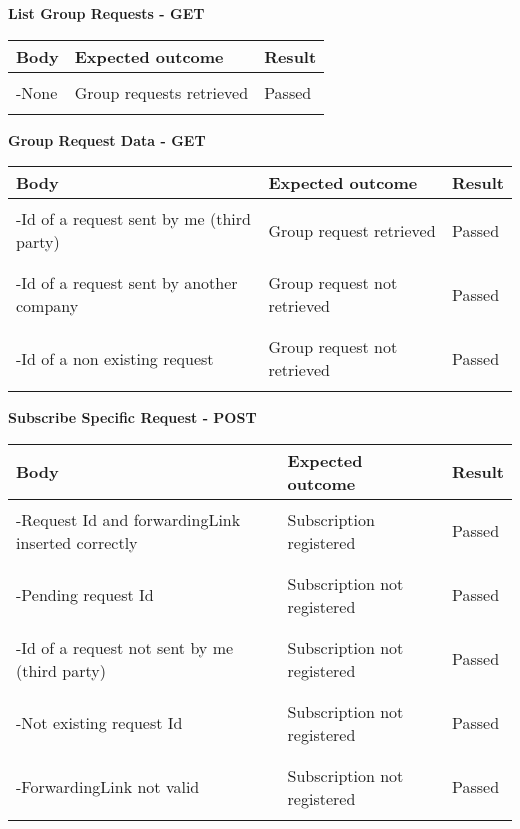 \textbf{List Group Requests - GET}
\begin{center}
	\begin{tabular}{|p{}|p{}|p{}|}
		\hline
		Body & Expected outcome & Result \\
		\hline
		&&\\
		-None  &Group requests retrieved&Passed\\
		&&\\
		\hline
	\end{tabular}
\end{center}
\textbf{Group Request Data - GET}
\begin{center}
	\begin{tabular}{|p{}|p{}|p{}|}
		\hline
		Body & Expected outcome & Result \\
		\hline
		&&\\
		-Id of a request sent by me (third party)  &Group request retrieved&Passed\\
		&&\\
		\hline
		&&\\
		-Id of a request sent by another company  &Group request not retrieved&Passed\\
		&&\\
		\hline
		&&\\
		-Id of a non existing request  &Group request not retrieved&Passed\\
		&&\\
		\hline
	\end{tabular}
\end{center}
\newpage
\textbf{Subscribe Specific Request - POST} 
\begin{center}
	\begin{tabular}{|p{}|p{}|p{}|}
		\hline
		Body & Expected outcome & Result \\
		\hline
		&&\\
		-Request Id and forwardingLink inserted correctly&Subscription registered&Passed\\
		&&\\
		\hline
		&&\\
		-Pending request Id & Subscription not registered & Passed\\
		&&\\
		\hline
		&&\\
		-Id of a request not sent by me (third party)&Subscription not registered&Passed\\
		&&\\
		\hline
		&&\\
		-Not existing request Id &Subscription not registered&Passed\\
		&&\\
		\hline
		&&\\
		-ForwardingLink not valid &Subscription not registered&Passed\\
		&&\\
		\hline
	\end{tabular}
\end{center}
